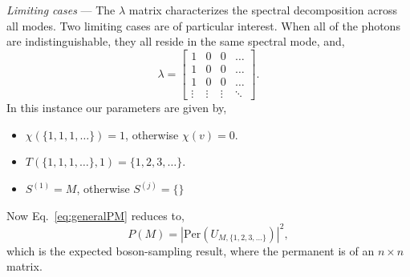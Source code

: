 \documentclass[aps,prl,twocolumn,amsmath,amssymb,nofootinbib,superscriptaddress]{revtex4}
\begin{document}
%
%

\emph{Limiting cases} --- The $\lambda$ matrix characterizes the spectral decomposition across all modes. Two limiting cases are of particular interest. When all of the photons are indistinguishable, they all reside in the same spectral mode, and,
\begin{equation}
\lambda =
\left[ \begin{array}{cccc}
1 & 0 & 0 & \ldots \\
1 & 0 & 0 & \ldots \\
1 & 0 & 0 & \ldots \\
\vdots & \vdots & \vdots & \ddots
\end{array} \right].
\end{equation}
In this instance our parameters are given by,
\begin{itemize}
\item \mbox{$\chi(\{1,1,1,\dots\})=1$}, otherwise \mbox{$\chi(v)=0$}.
\item \mbox{$T(\{1,1,1,\dots\},1)=\{1,2,3,\dots\}$}.
\item $S^{(1)}=M$, otherwise $S^{(j)}=\{\}$
\end{itemize}
Now Eq.~\ref{eq:generalPM} reduces to,
\begin{equation}
P(M) = \left|\mathrm{Per}\left(U_{M,\{1,2,3,\dots\}}\right)\right|^2,
\end{equation}
which is the expected boson-sampling result, where the permanent is of an \mbox{$n\times n$} matrix.
\end{document}
